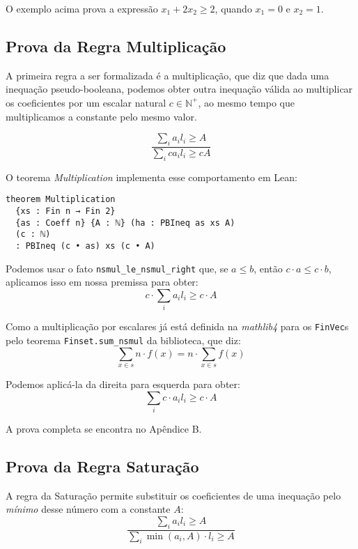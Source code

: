 \documentclass[conference]{IEEEtran}
\begin{document}
O exemplo acima prova a expressão $x_1 + 2 x_2 \ge 2$, quando $x_1 = 0$ e $x_2 = 1$.


\subsection{Prova da Regra Multiplicação}
A primeira regra a ser formalizada é a multiplicação, que diz que dada uma inequação pseudo-booleana, podemos obter
outra inequação válida ao multiplicar os coeficientes por um escalar natural $c \in \mathbb{N}^+ $, ao mesmo tempo que multiplicamos
a constante pelo mesmo valor.

\begin{equation}
    \frac
    {\sum_i{a_i l_i} \ge A}
    {\sum_i{c a_i l_i} \ge c A}
\end{equation}

O teorema \textit{Multiplication} implementa esse comportamento em Lean:
\begin{verbatim}
theorem Multiplication
  {xs : Fin n → Fin 2}
  {as : Coeff n} {A : ℕ} (ha : PBIneq as xs A)
  (c : ℕ)
  : PBIneq (c • as) xs (c • A)
\end{verbatim}

Podemos usar o fato \texttt{nsmul\_le\_nsmul\_right} que, se $a \le b$, então $c \cdot a \le c \cdot b$, aplicamos isso em nossa premissa para obter:
\begin{equation}
    c \cdot \sum_i{a_i l_i} \ge c \cdot A
\end{equation}

Como a multiplicação por escalares já está definida na \textit{mathlib4} para
os \texttt{FinVec}s pelo teorema \texttt{Finset.sum\_nsmul} da biblioteca,
que diz:
\begin{equation}
    \sum_{x \in s}{n \cdot f(x)} = n \cdot \sum_{x \in s}{f(x)}
\end{equation}

Podemos aplicá-la da direita para esquerda para obter:
\begin{equation}
    \sum_i{c \cdot a_i l_i} \ge c \cdot A
\end{equation}

A prova completa se encontra no Apêndice B.


\subsection{Prova da Regra Saturação}
A regra da Saturação permite substituir os coeficientes de uma inequação pelo \textit{mínimo} desse número com a constante $A$:
\begin{equation}
    \frac
    {\sum_i{a_i l_i} \ge A}
    {\sum_i{ \min(a_i,A)\cdot l_i} \ge A}
\end{equation}
\end{document}
